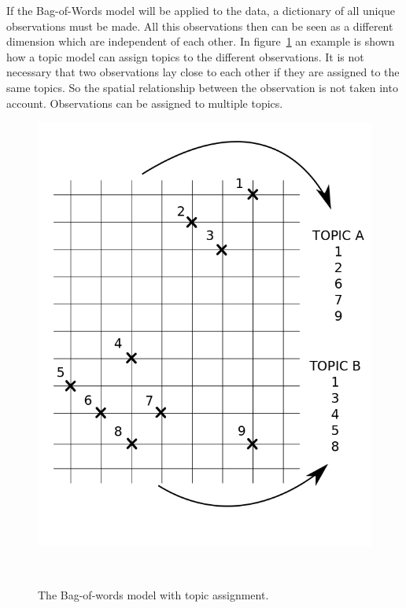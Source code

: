 If the Bag-of-Words model will be applied to the data, a dictionary of all unique observations must be made. All this observations then can be seen as a different dimension which are independent of each other. In figure~\ref{fig:FSBOW} an example is shown how a topic model can assign topics to the different observations. It is not necessary that two observations lay close to each other if they are assigned to the same topics. So the spatial relationship between the observation is not taken into account. Observations can be assigned to multiple topics.\\
\begin{figure}[h!]
\centering
\begin{minipage}[b]{0.3\linewidth}
\centering
\includegraphics[width=\textwidth]{Pictures/BOW.png}
\caption{The Bag-of-words model with topic assignment.}
\label{fig:FSBOW}
\end{minipage}
~
\begin{minipage}[b]{0.3\linewidth}
\centering

\end{minipage}
\end{figure}
